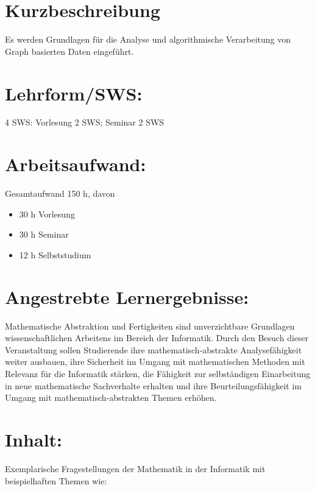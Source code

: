 \section*{Kurzbeschreibung}\label{kurzbeschreibung-1}

Es werden Grundlagen für die Analyse und algorithmische Verarbeitung von
Graph basierten Daten eingeführt.

\section*{Lehrform/SWS:}\label{lehrformsws-2}

4 SWS: Vorlesung 2 SWS; Seminar 2 SWS

\section*{Arbeitsaufwand:}\label{arbeitsaufwand-2}

Gesamtaufwand 150 h, davon

\begin{itemize}
\tightlist
\item
  30 h Vorlesung
\item
  30 h Seminar
\item
  12 h Selbststudium
\end{itemize}

\section*{Angestrebte
Lernergebnisse:}\label{angestrebte-lernergebnisse-2}

Mathematische Abstraktion und Fertigkeiten sind unverzichtbare
Grundlagen wissenschaftlichen Arbeitens im Bereich der Informatik. Durch
den Besuch dieser Veranstaltung sollen Studierende ihre
mathematisch-abstrakte Analysefähigkeit weiter ausbauen, ihre Sicherheit
im Umgang mit mathematischen Methoden mit Relevanz für die Informatik
stärken, die Fähigkeit zur selbständigen Einarbeitung in neue
mathematische Sachverhalte erhalten und ihre Beurteilungsfähigkeit im
Umgang mit mathematisch-abstrakten Themen erhöhen.

\section*{Inhalt:}\label{inhalt-2}

Exemplarische Fragestellungen der Mathematik in der Informatik mit
beispielhaften Themen wie:

